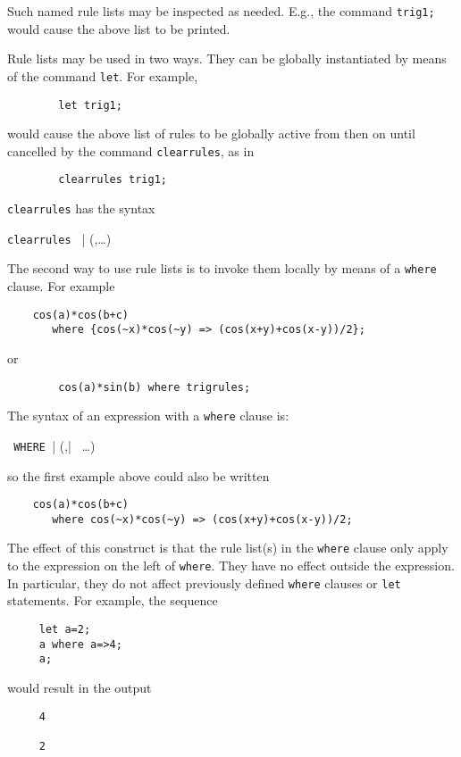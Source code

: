 Such named rule lists may be inspected as needed. E.g., the command
\texttt{trig1;} would cause the above list to be printed.

\hypertarget{CLEARRULES}{}
Rule lists may be used in two ways.  They can be globally instantiated by
means of the command \texttt{let}. For example,
\begin{verbatim}
        let trig1;
\end{verbatim}
would cause the above list of rules to be globally active from then on until
cancelled by the command \texttt{clearrules}, as in
\begin{verbatim}
        clearrules trig1;
\end{verbatim}
\texttt{clearrules} has the syntax
\begin{syntax}
  \texttt{clearrules } | (,\ldots)
\end{syntax}

\hypertarget{operator:WHERE}{}
The second way to use rule lists is to invoke them locally by means of a
\texttt{where} clause.  For example
\begin{verbatim}
    cos(a)*cos(b+c)
       where {cos(~x)*cos(~y) => (cos(x+y)+cos(x-y))/2};
\end{verbatim}
or
\begin{verbatim}
        cos(a)*sin(b) where trigrules;
\end{verbatim}

The syntax of an expression with a \texttt{where} clause is:
\begin{syntax}
  \texttt{ WHERE }| (,| \ \ldots)
\end{syntax}
so the first example above could also be written
\begin{verbatim}
    cos(a)*cos(b+c)
       where cos(~x)*cos(~y) => (cos(x+y)+cos(x-y))/2;
\end{verbatim}

The effect of this construct is that the rule list(s) in the \texttt{where}
clause only apply to the expression on the left of \texttt{where}.  They have
no effect outside the expression.  In particular, they do not affect
previously defined \texttt{where} clauses or \texttt{let} statements.  For
example, the sequence
\begin{verbatim}
     let a=2;
     a where a=>4;
     a;
\end{verbatim}
would result in the output
\begin{verbatim}
     4

     2
\end{verbatim}

